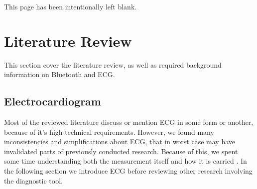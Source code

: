 \newpage
\thispagestyle{empty}
This page has been intentionally left blank.

\newpage


\section{Literature Review} %
\label{sec:literature_review}


This section cover the literature review, as well as required background information on Bluetooth and ECG.

\subsection{Electrocardiogram} %
\label{sub:electrocardiogram}

Most of the reviewed literature discuss or mention ECG in some form or another, because of it's high technical requirements. However, we found many inconsistencies and simplifications about ECG, that in worst case may have invalidated parts of previously conducted research. Because of this, we spent some time understanding both the measurement itself and how it is carried . In the following section we introduce ECG before reviewing other research involving the diagnostic tool.

